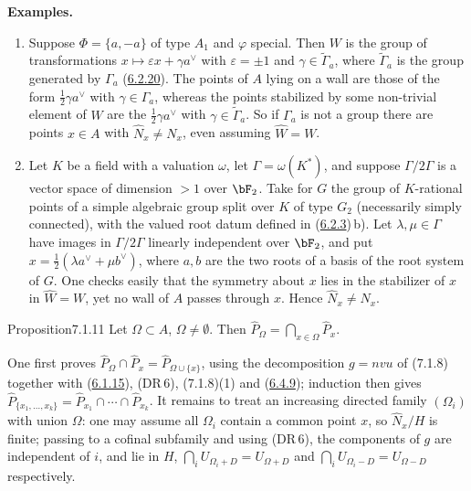 \documentclass[12pt,a4paper,oneside,english]{smfart}
\makeatletter
\newcommand{\btanchor}[1]{\leavevmode\Hy@raisedlink{\hypertarget{bt:#1}{}}}
\newcommand{\btref}[1]{\hyperlink{bt:#1}{#1}}
\theoremstyle{definition}
\theoremstyle{bt}
\makeatother
\begin{document}
\noindent\textbf{Examples.}
\begin{enumerate}
\item Suppose $\Phi=\{a,-a\}$ of type $A_1$ and $\varphi$ special. Then
  $W$ is the group of transformations $x\mapsto\varepsilon x+\gamma a^{\vee}$
  with $\varepsilon=\pm1$ and $\gamma\in\widetilde{\Gamma}_a$, where
  $\widetilde{\Gamma}_a$ is the group generated by $\Gamma_a$ (\btref{6.2.20}).
  The points of $A$ lying on a wall are those of the form
  $\tfrac12\gamma a^{\vee}$ with $\gamma\in\Gamma_a$, whereas the points
  stabilized by some non-trivial element of $W$ are the
  $\tfrac12\gamma a^{\vee}$ with $\gamma\in\widetilde{\Gamma}_a$. So if
  $\Gamma_a$ is not a group there are points $x\in A$ with
  $\widehat{N}_x\ne N_x$, even assuming $\widehat{W}=W$.
\item Let $K$ be a field with a valuation $\omega$, let
  $\Gamma=\omega(K^{*})$, and suppose $\Gamma/2\Gamma$ is a vector space
  of dimension $>1$ over $\bF_2$. Take for $G$ the group of
  $K$-rational points of a simple algebraic group split over $K$ of type
  $G_2$ (necessarily simply connected), with the valued root datum
  defined in (\btref{6.2.3})\,b). Let $\lambda,\mu\in\Gamma$ have images in
  $\Gamma/2\Gamma$ linearly independent over $\bF_2$, and put
  $x=\tfrac12(\lambda a^{\vee}+\mu b^{\vee})$, where $a,b$ are the two
  roots of a basis of the root system of $G$. One checks easily that the
  symmetry about $x$ lies in the stabilizer of $x$ in $\widehat{W}=W$,
  yet no wall of $A$ passes through $x$. Hence
  $\widehat{N}_x\ne N_x$.
\end{enumerate}

\begin{bt}{Proposition}{7.1.11}\btanchor{7.1.11}
Let $\Omega\subset A$, $\Omega\ne\emptyset$. Then
$\displaystyle\widehat{P}_\Omega=\bigcap_{x\in\Omega}\widehat{P}_x$.
\end{bt}

\begin{sketch}
One first proves
$\widehat{P}_\Omega\cap\widehat{P}_x=\widehat{P}_{\Omega\cup\{x\}}$,
using the decomposition $g=nvu$ of (7.1.8) together with (\btref{6.1.15}),
(DR\,6), (7.1.8)(1) and (\btref{6.4.9}); induction then gives
$\widehat{P}_{\{x_1,\dots,x_k\}}=\widehat{P}_{x_1}\cap\cdots\cap\widehat{P}_{x_k}$.
It remains to treat an increasing directed family $(\Omega_i)$ with union
$\Omega$: one may assume all $\Omega_i$ contain a common point $x$, so
$\widehat{N}_x/H$ is finite; passing to a cofinal subfamily and using
(DR\,6), the components of $g$ are independent of $i$, and lie in $H$,
$\bigcap_i U_{\Omega_i+D}=U_{\Omega+D}$ and
$\bigcap_i U_{\Omega_i-D}=U_{\Omega-D}$ respectively.
\end{sketch}
\end{document}
